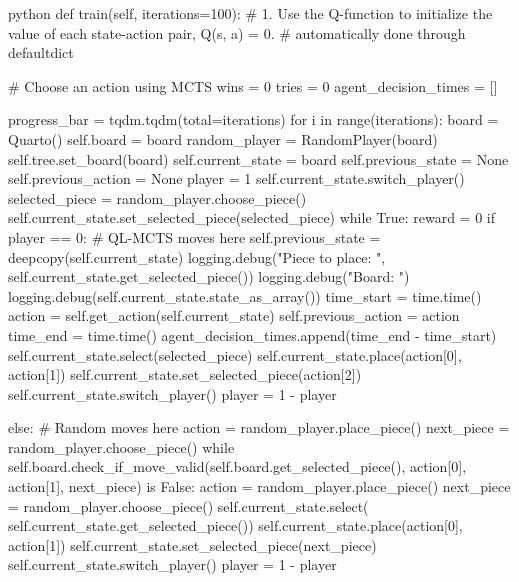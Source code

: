 \begin{mintedbox}{python}
    def train(self, iterations=100):
        # 1. Use the Q-function to initialize the value of each state-action pair, Q(s, a) = 0.
        # automatically done through defaultdict

        # Choose an action using MCTS
        wins = 0
        tries = 0
        agent_decision_times = []

        progress_bar = tqdm.tqdm(total=iterations)
        for i in range(iterations):
            board = Quarto()
            self.board = board
            random_player = RandomPlayer(board)
            self.tree.set_board(board)
            self.current_state = board
            self.previous_state = None
            self.previous_action = None
            player = 1
            self.current_state.switch_player()
            selected_piece = random_player.choose_piece()
            self.current_state.set_selected_piece(selected_piece)
            while True:
                reward = 0
                if player == 0:
                    # QL-MCTS moves here
                    self.previous_state = deepcopy(self.current_state)
                    logging.debug("Piece to place: ",
                                    self.current_state.get_selected_piece())
                    logging.debug("Board: ")
                    logging.debug(self.current_state.state_as_array())
                    time_start = time.time()
                    action = self.get_action(self.current_state)
                    self.previous_action = action
                    time_end = time.time()
                    agent_decision_times.append(time_end - time_start)
                    self.current_state.select(selected_piece)
                    self.current_state.place(action[0], action[1])
                    self.current_state.set_selected_piece(action[2])
                    self.current_state.switch_player()
                    player = 1 - player

                else:
                    # Random moves here
                    action = random_player.place_piece()
                    next_piece = random_player.choose_piece()
                    while self.board.check_if_move_valid(self.board.get_selected_piece(), action[0], action[1], next_piece) is False:
                        action = random_player.place_piece()
                        next_piece = random_player.choose_piece()
                    self.current_state.select(
                        self.current_state.get_selected_piece())
                    self.current_state.place(action[0], action[1])
                    self.current_state.set_selected_piece(next_piece)
                    self.current_state.switch_player()
                    player = 1 - player


\end{mintedbox}
